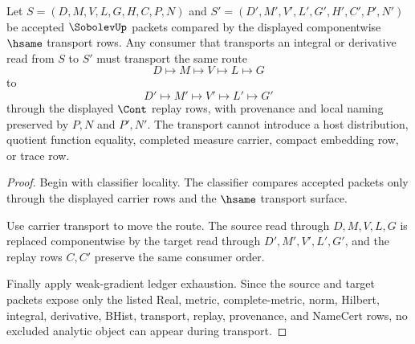 \begin{theorem}
\label{thm:sobolev-integral-derivative-transport-stability}
Let $S=(D,M,V,L,G,H,C,P,N)$ and $S'=(D',M',V',L',G',H',C',P',N')$ be accepted $\SobolevUp$ packets compared by the displayed componentwise $\hsame$ transport rows. Any consumer that transports an integral or derivative read from $S$ to $S'$ must transport the same route
$$
D \longmapsto M \longmapsto V \longmapsto L \longmapsto G
$$
to
$$
D' \longmapsto M' \longmapsto V' \longmapsto L' \longmapsto G'
$$
through the displayed $\Cont$ replay rows, with provenance and local naming preserved by $P,N$ and $P',N'$. The transport cannot introduce a host distribution, quotient function equality, completed measure carrier, compact embedding row, or trace row.
\end{theorem}
\begin{proof}
Begin with classifier locality. The classifier compares accepted packets only through the displayed carrier rows and the $\hsame$ transport surface.

Use carrier transport to move the route. The source read through $D,M,V,L,G$ is replaced componentwise by the target read through $D',M',V',L',G'$, and the replay rows $C,C'$ preserve the same consumer order.

Finally apply weak-gradient ledger exhaustion. Since the source and target packets expose only the listed Real, metric, complete-metric, norm, Hilbert, integral, derivative, BHist, transport, replay, provenance, and NameCert rows, no excluded analytic object can appear during transport.
\end{proof}


